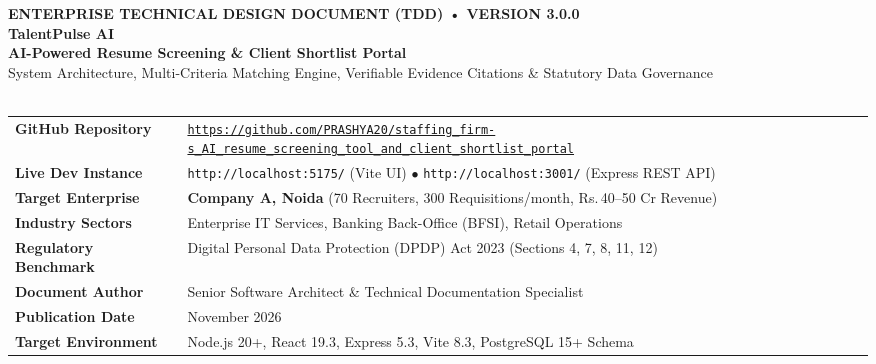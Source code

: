 \documentclass[11pt,a4paper,oneside]{report}
\newcommand{\INR}{\textsf{Rs.\,}}
\begin{document}
\begin{titlepage}
    \thispagestyle{empty}
    \vspace*{0.5cm}
    
    {\noindent\footnotesize\bfseries\color{primary}\textsf{ENTERPRISE TECHNICAL DESIGN DOCUMENT (TDD) • VERSION 3.0.0}}\\[0.8em]
    {\noindent\Huge\bfseries\color{navy}\textsf{TalentPulse AI}}\\[0.4em]
    {\noindent\Large\bfseries\color{textbody}\textsf{AI-Powered Resume Screening \& Client Shortlist Portal}}\\[0.8em]
    {\noindent\normalsize\color{textmuted}\textsf{System Architecture, Multi-Criteria Matching Engine, Verifiable Evidence Citations \& Statutory Data Governance}}\\[1.5em]
    \noindent{\color{primary}\rule{\textwidth}{2pt}}\\[2.5em]
    
    \begin{table}[H]
    \renewcommand{\arraystretch}{1.3}
    \begin{tabularx}{\textwidth}{@{} >{\bfseries\sffamily\color{charcoal}\columncolor{bgsubtle}}p{4.2cm} X @{}}
        \toprule
        GitHub Repository & \href{https://github.com/PRASHYA20/staffing_firm-s_AI_resume_screening_tool_and_client_shortlist_portal}{\nolinkurl{https://github.com/PRASHYA20/staffing_firm-s_AI_resume_screening_tool_and_client_shortlist_portal}} \\
        Live Dev Instance & \texttt{http://localhost:5175/} (Vite UI) $\bullet$ \texttt{http://localhost:3001/} (Express REST API) \\
        Target Enterprise & \textbf{Company A, Noida} (70 Recruiters, 300 Requisitions/month, \INR 40--50 Cr Revenue) \\
        Industry Sectors & Enterprise IT Services, Banking Back-Office (BFSI), Retail Operations \\
        Regulatory Benchmark & Digital Personal Data Protection (DPDP) Act 2023 (Sections 4, 7, 8, 11, 12) \\
        Document Author & Senior Software Architect \& Technical Documentation Specialist \\
        Publication Date & November 2026 \\
        Target Environment & Node.js 20+, React 19.3, Express 5.3, Vite 8.3, PostgreSQL 15+ Schema \\
        \bottomrule
    \end{tabularx}
    \end{table}
    

\end{titlepage}
\end{document}
